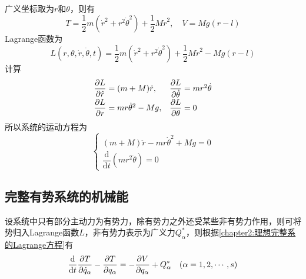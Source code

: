 \begin{solution}
广义坐标取为$r$和$\theta$，则有
\begin{equation*}
	T = \frac12 m(\dot{r}^2 + r^2 \dot{\theta}^2) + \frac12 M\dot{r}^2,\quad V = Mg(r-l)
\end{equation*}
Lagrange函数为
\begin{equation*}
	L(r,\theta,\dot{r},\dot{\theta},t) = \frac12 m(\dot{r}^2 + r^2 \dot{\theta}^2) + \frac12 M\dot{r}^2 - Mg(r-l)
\end{equation*}
计算
\begin{align*}
\begin{array}{ll}
	\dfrac{\partial L}{\partial \dot{r}} = (m+M) \dot{r}, & \dfrac{\partial L}{\partial \dot{\theta}} = mr^2 \dot{\theta} \\[1.5ex]
	\dfrac{\partial L}{\partial r} = mr\dot{\theta}^2 - Mg, & \dfrac{\partial L}{\partial \theta} = 0
\end{array}
\end{align*}
所以系统的运动方程为
\begin{equation*}
	\begin{cases}
		(m+M) \ddot{r} - mr\dot{\theta}^2 + Mg = 0 \\
		\dfrac{\mathrm{d}}{\mathrm{d} t}(mr^2 \dot{\theta}) = 0
	\end{cases}
\end{equation*}
\end{solution}

\subsection{完整有势系统的机械能}

设系统中只有部分主动力为有势力，除有势力之外还受某些非有势力作用，则可将势归入Lagrange函数$L$，非有势力表示为广义力$Q_\alpha^*$，则根据\eqref{chapter2:理想完整系的Lagrange方程}有
\begin{equation}
	\frac{\mathrm{d}}{\mathrm{d} t} \frac{\partial T}{\partial \dot{q}_\alpha} - \frac{\partial T}{\partial q_\alpha} = -\frac{\partial V}{\partial q_\alpha} + Q_\alpha^* \quad (\alpha =1,2,\cdots,s)
	\label{chapter2:部分主动力为有势力的完整系统的Lagrange方程}
\end{equation}

